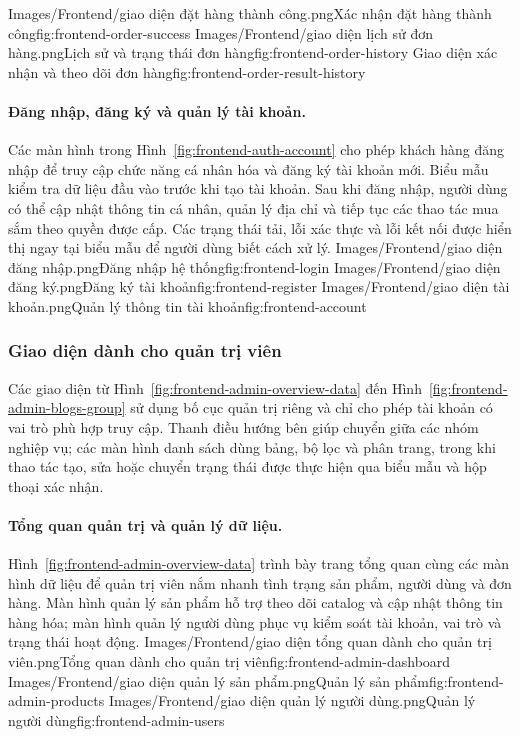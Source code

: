 \frontendpair
{Images/Frontend/giao diện đặt hàng thành công.png}{Xác nhận đặt hàng thành công}{fig:frontend-order-success}
{Images/Frontend/giao diện lịch sử đơn hàng.png}{Lịch sử và trạng thái đơn hàng}{fig:frontend-order-history}
{Giao diện xác nhận và theo dõi đơn hàng}{fig:frontend-order-result-history}

\paragraph{Đăng nhập, đăng ký và quản lý tài khoản.}

Các màn hình trong Hình~\ref{fig:frontend-auth-account} cho phép khách hàng đăng nhập để truy cập chức năng cá nhân hóa và đăng ký tài khoản mới. Biểu mẫu kiểm
tra dữ liệu đầu vào trước khi tạo tài khoản. Sau khi đăng nhập, người dùng có thể cập nhật thông tin
cá nhân, quản lý địa chỉ và tiếp tục các thao tác mua sắm theo quyền được cấp. Các trạng thái tải,
lỗi xác thực và lỗi kết nối được hiển thị ngay tại biểu mẫu để người dùng biết cách xử lý.
{Images/Frontend/giao diện đăng nhập.png}{Đăng nhập hệ thống}{fig:frontend-login}
{Images/Frontend/giao diện đăng ký.png}{Đăng ký tài khoản}{fig:frontend-register}
{Images/Frontend/giao diện tài khoản.png}{Quản lý thông tin tài khoản}{fig:frontend-account}

\subsubsection{Giao diện dành cho quản trị viên}

Các giao diện từ Hình~\ref{fig:frontend-admin-overview-data} đến Hình~\ref{fig:frontend-admin-blogs-group}
sử dụng bố cục quản trị riêng và chỉ cho phép tài khoản có vai trò phù hợp truy cập. Thanh
điều hướng bên giúp chuyển giữa các nhóm nghiệp vụ; các màn hình danh sách dùng bảng, bộ lọc và
phân trang, trong khi thao tác tạo, sửa hoặc chuyển trạng thái được thực hiện qua biểu mẫu và hộp
thoại xác nhận.

\paragraph{Tổng quan quản trị và quản lý dữ liệu.}

Hình~\ref{fig:frontend-admin-overview-data} trình bày trang tổng quan cùng các màn hình dữ liệu để quản trị viên nắm nhanh tình trạng sản phẩm, người
dùng và đơn hàng. Màn hình quản lý sản phẩm hỗ trợ theo dõi catalog và cập nhật thông tin hàng hóa;
màn hình quản lý người dùng phục vụ kiểm soát tài khoản, vai trò và trạng thái hoạt động.
{Images/Frontend/giao diện tổng quan dành cho quản trị viên.png}{Tổng quan dành cho quản trị viên}{fig:frontend-admin-dashboard}
{Images/Frontend/giao diện quản lý sản phẩm.png}{Quản lý sản phẩm}{fig:frontend-admin-products}
{Images/Frontend/giao diện quản lý người dùng.png}{Quản lý người dùng}{fig:frontend-admin-users}

